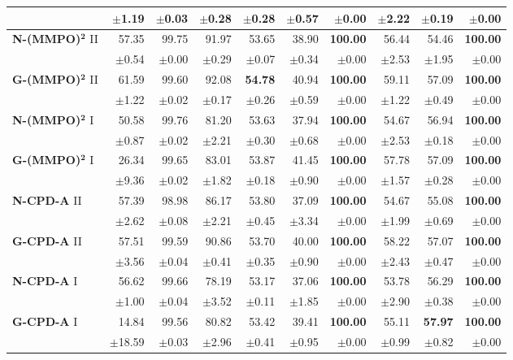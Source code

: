 \begin{table}[!htbp]
\begin{tabular}{lrrrrr||rrrr}
 & $\pm$1.19 & $\pm$0.03 & $\pm$0.28 & $\pm$0.28 & $\pm$0.57 & $\pm$0.00 & $\pm$2.22 & $\pm$0.19 & $\pm$0.00 \\
\midrule
\textbf{N-(MMPO)}$\bm{^2}$ II & 57.35 & 99.75 & 91.97 & 53.65 & 38.90 & \textbf{100.00} & 56.44 & 54.46 & \textbf{100.00} \\
 & $\pm$0.54 & $\pm$0.00 & $\pm$0.29 & $\pm$0.07 & $\pm$0.34 & $\pm$0.00 & $\pm$2.53 & $\pm$1.95 & $\pm$0.00 \\
\midrule
\textbf{G-(MMPO)}$\bm{^2}$ II & 61.59 & 99.60 & 92.08 & \textbf{54.78} & 40.94 & \textbf{100.00} & 59.11 & 57.09 & \textbf{100.00} \\
 & $\pm$1.22 & $\pm$0.02 & $\pm$0.17 & $\pm$0.26 & $\pm$0.59 & $\pm$0.00 & $\pm$1.22 & $\pm$0.49 & $\pm$0.00 \\
\midrule
\textbf{N-(MMPO)}$\bm{^2}$ I & 50.58 & 99.76 & 81.20 & 53.63 & 37.94 & \textbf{100.00} & 54.67 & 56.94 & \textbf{100.00} \\
 & $\pm$0.87 & $\pm$0.02 & $\pm$2.21 & $\pm$0.30 & $\pm$0.68 & $\pm$0.00 & $\pm$2.53 & $\pm$0.18 & $\pm$0.00 \\
\midrule
\textbf{G-(MMPO)}$\bm{^2}$ I & 26.34 & 99.65 & 83.01 & 53.87 & 41.45 & \textbf{100.00} & 57.78 & 57.09 & \textbf{100.00} \\
 & $\pm$9.36 & $\pm$0.02 & $\pm$1.82 & $\pm$0.18 & $\pm$0.90 & $\pm$0.00 & $\pm$1.57 & $\pm$0.28 & $\pm$0.00 \\
\midrule
\textbf{N-CPD-A} II & 57.39 & 98.98 & 86.17 & 53.80 & 37.09 & \textbf{100.00} & 54.67 & 55.08 & \textbf{100.00} \\
 & $\pm$2.62 & $\pm$0.08 & $\pm$2.21 & $\pm$0.45 & $\pm$3.34 & $\pm$0.00 & $\pm$1.99 & $\pm$0.69 & $\pm$0.00 \\
\midrule
\textbf{G-CPD-A} II & 57.51 & 99.59 & 90.86 & 53.70 & 40.00 & \textbf{100.00} & 58.22 & 57.07 & \textbf{100.00} \\
 & $\pm$3.56 & $\pm$0.04 & $\pm$0.41 & $\pm$0.35 & $\pm$0.90 & $\pm$0.00 & $\pm$2.43 & $\pm$0.47 & $\pm$0.00 \\
\midrule
\textbf{N-CPD-A} I & 56.62 & 99.66 & 78.19 & 53.17 & 37.06 & \textbf{100.00} & 53.78 & 56.29 & \textbf{100.00} \\
 & $\pm$1.00 & $\pm$0.04 & $\pm$3.52 & $\pm$0.11 & $\pm$1.85 & $\pm$0.00 & $\pm$2.90 & $\pm$0.38 & $\pm$0.00 \\
\midrule
\textbf{G-CPD-A} I & 14.84 & 99.56 & 80.82 & 53.42 & 39.41 & \textbf{100.00} & 55.11 & \textbf{57.97} & \textbf{100.00} \\
 & $\pm$18.59 & $\pm$0.03 & $\pm$2.96 & $\pm$0.41 & $\pm$0.95 & $\pm$0.00 & $\pm$0.99 & $\pm$0.82 & $\pm$0.00 \\

\end{tabular}
\end{table}
